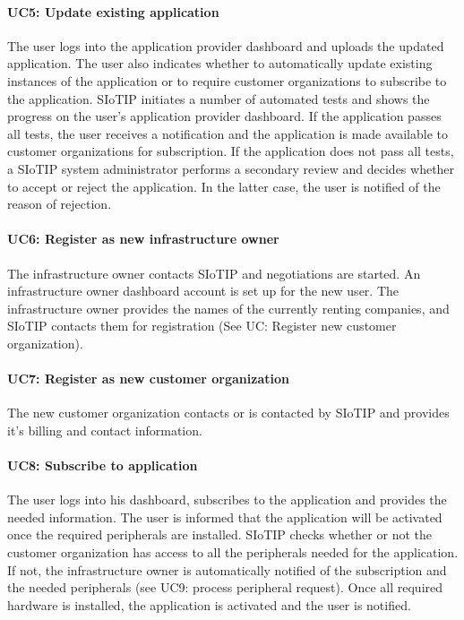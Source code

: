 \documentclass[english]{sareport}
\begin{document}
\paragraph{UC5: Update existing application}
The user logs into the application provider dashboard and uploads the updated application. The user also indicates whether to automatically update existing instances of the application or to require customer organizations to subscribe to the application. SIoTIP initiates a number of automated tests and shows the progress on the user's application provider dashboard. If the application passes all tests, the user receives a notification and the application is made available to customer organizations for subscription. If the application does not pass all tests, a SIoTIP system administrator performs a secondary review and decides whether to accept or reject the application. In the latter case, the user is notified of the reason of rejection.

\paragraph{UC6: Register as new infrastructure owner}
The infrastructure owner contacts SIoTIP and negotiations are started. An infrastructure owner dashboard account is set up for the new user. The infrastructure owner provides the names of the currently renting companies, and SIoTIP contacts them for registration (See UC: Register new customer organization).

\paragraph{UC7: Register as new customer organization}
The new customer organization contacts or is contacted by SIoTIP and provides it's billing and contact information.

\paragraph{UC8: Subscribe to application}
The user logs into his dashboard, subscribes to the application and provides the needed information. The user is informed that the application will be activated once the required peripherals are installed. SIoTIP checks whether or not the customer organization has access to all the peripherals needed for the application. If not, the infrastructure owner is automatically notified of the subscription and the needed peripherals (see UC9: process peripheral request). Once all required hardware is installed, the application is activated and the user is notified.
\end{document}
